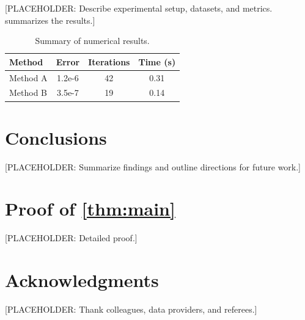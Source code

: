 \documentclass[review,hidelinks,onefignum,onetabnum]{siamart220329}
\begin{document}
[PLACEHOLDER: Describe experimental setup, datasets, and metrics.
 summarizes the results.]

\begin{table}[htbp]
  \footnotesize
  \caption{Summary of numerical results.}
  \label{tab:results}
  \begin{center}
    \begin{tabular}{|l|c|c|c|} \hline
      Method & Error & Iterations & Time (s) \\ \hline
      Method A & 1.2e-6 & 42 & 0.31 \\
      Method B & 3.5e-7 & 19 & 0.14 \\ \hline
    \end{tabular}
  \end{center}
\end{table}

\section{Conclusions}
\label{sec:conclusions}

[PLACEHOLDER: Summarize findings and outline directions for future work.]

\appendix
\section{Proof of \cref{thm:main}}
\label{sec:proof}

[PLACEHOLDER: Detailed proof.]

\section*{Acknowledgments}

[PLACEHOLDER: Thank colleagues, data providers, and referees.]



\end{document}
